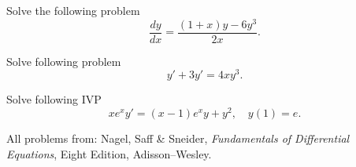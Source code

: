 \documentclass[11pt]{article}
\begin{document}
\begin{problem}
Solve the following problem
\begin{equation*}
     \frac{dy}{dx}=\frac{(1+x)y-6y^{3}}{2x}.
\end{equation*}
\end{problem}




\begin{problem}
Solve following problem
\begin{equation*}
      y'+3y'=4xy^{3}.
\end{equation*}
\end{problem}


\begin{problem}
Solve following IVP
\begin{equation*}
      xe^{x}y' = (x-1)e^{x}y+y^{2}, \quad y(1)=e.
\end{equation*}
\end{problem}







\LabSolutions

All problems from: Nagel, Saff \& Sneider, \textit{Fundamentals of Differential Equations}, Eight Edition, Adisson--Wesley.
\end{document}
